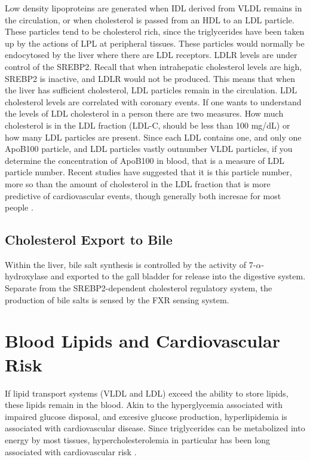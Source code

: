 \documentclass{tufte-handout}
\begin{document}
Low density lipoproteins are generated when IDL derived from VLDL remains in the circulation, or when cholesterol is passed from an HDL to an LDL particle.  These particles tend to be cholesterol rich, since the triglycerides have been taken up by the actions of LPL at peripheral tissues.  These particles would normally be endocytosed by the liver where there are LDL receptors.  LDLR levels are under control of the SREBP2.  Recall that when intrahepatic cholesterol levels are high, SREBP2 is inactive, and LDLR would not be produced.  This means that when the liver has sufficient cholesterol, LDL particles remain in the circulation.  LDL cholesterol levels are correlated with coronary events.  If one wants to understand the levels of LDL cholesterol in a person there are two measures.  How much cholesterol is in the LDL fraction (LDL-C, should be less than 100 mg/dL) or how many LDL particles are present.  Since each LDL contains one, and only one ApoB100 particle, and LDL particles vastly outnumber VLDL particles, if you determine the concentration of ApoB100 in blood, that is a measure of LDL particle number.  Recent studies have suggested that it is this particle number, more so than the amount of cholesterol in the LDL fraction that is more predictive of cardiovascular events, though generally both incresae for most people \citep{Cromwell2007,Mora2007}.

\subsection{Cholesterol Export to Bile}

Within the liver, bile salt synthesis is controlled by the activity of 7-$\alpha$-hydroxylase and exported to the gall bladder for release into the digestive system.  Separate from the SREBP2-dependent cholesterol regulatory system, the production of bile salts is sensed by the FXR sensing system.

\section{Blood Lipids and Cardiovascular Risk}

If lipid transport systems (VLDL and LDL) exceed the ability to store lipids, these lipids remain in the blood.  Akin to the hyperglycemia associated with impaired glucose disposal, and excesive glucose production, hyperlipidemia is associated with cardiovascular disease.  Since triglycerides can be metabolized into energy by most tissues, hypercholesterolemia in particular has been long associated with cardiovascular risk \citep{Keys1963}.
\end{document}
